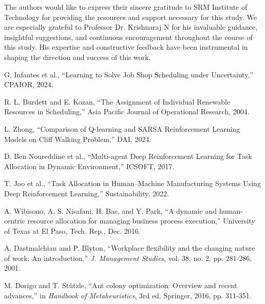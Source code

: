 \documentclass[%
aip,
cp,  %
amsmath,amssymb,
reprint,%
]{revtex4-2}
\begin{document}
	\begin{acknowledgments}
		The authors would like to express their sincere gratitude to SRM Institute of
		Technology for providing the resources and support necessary for this study. We
		are especially grateful to Professor Dr. Krishnaraj N for his invaluable
		guidance, insightful suggestions, and continuous encouragement throughout the
		course of this study. His expertise and constructive feedback have been instrumental
		in shaping the direction and success of this work.
	\end{acknowledgments}
	
	\nocite{*}
	
	\begin{thebibliography}{99}
		 G. Infantes et al., ``Learning to Solve Job Shop Scheduling
		under Uncertainty,'' CPAIOR, 2024.
		
		 R. L. Burdett and E. Kozan, ``The Assignment of
		Individual Renewable Resources in Scheduling,'' Asia Pacific Journal of
		Operational Research, 2004.
		
		 L. Zhong, ``Comparison of Q-learning and SARSA
		Reinforcement Learning Models on Cliff Walking Problem,'' DAI, 2024.
		
		 D. Ben Noureddine et al., ``Multi-agent Deep Reinforcement
		Learning for Task Allocation in Dynamic Environment,'' ICSOFT, 2017.
		
		 T. Joo et al., ``Task Allocation in Human–Machine Manufacturing
		Systems Using Deep Reinforcement Learning,'' Sustainability, 2022.
		
		 A. Wibisono, A. S. Nisafani, H. Bae, and Y. Park, ``A dynamic
		and human-centric resource allocation for managing business process execution,''
		University of Texas at El Paso, Tech. Rep., Dec. 2016.
		
		 A. Dastmalchian and P. Blyton, ``Workplace flexibility
		and the changing nature of work: An introduction,'' \textit{J. Management Studies},
		vol. 38, no. 2, pp. 281-286, 2001.
		
		 M. Dorigo and T. Stützle, ``Ant colony optimization:
		Overview and recent advances,'' in \textit{Handbook of Metaheuristics}, 3rd
		ed. Springer, 2016, pp. 311-351.
	\end{thebibliography}
	
\end{document}
